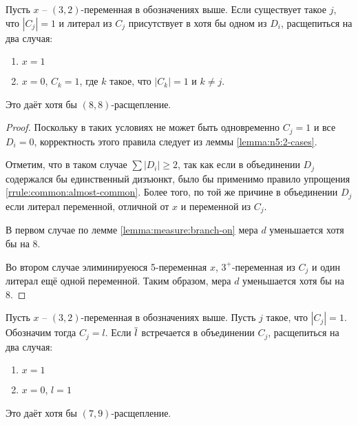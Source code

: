 \begin{brule}
 Пусть $x$ -- $(3,2)$-переменная в обозначениях выше. Если существует такое $j$, что $|C_j| = 1$ и литерал из $C_j$ присутствует в хотя бы одном из $D_i$, расщепиться на два случая:

 \begin{enumerate}
  \item $x = 1$
  \item $x = 0$, $C_k = 1$, где $k$ такое, что $|C_k| = 1$ и $k \neq j$.
 \end{enumerate}

 Это даёт хотя бы $(8,8)$-расщепление.
 \label{brule:n5:32-rest:same}
\end{brule}

\begin{proof}
 Поскольку в таких условиях не может быть одновременно $C_j = 1$ и все $D_i = 0$, корректность этого правила следует из леммы \ref{lemma:n5:2-cases}.

 Отметим, что в таком случае $\sum |D_i| \geq 2$, так как если в объединении $D_j$ содержался бы единственный дизъюнкт, было бы применимо правило упрощения \ref{rrule:common:almost-common}. Более того, по той же причине в объединении $D_j$ если литерал переменной, отличной от $x$ и переменной из $C_j$.

 В первом случае по лемме \ref{lemma:measure:branch-on} мера $d$ уменьшается хотя бы на 8.

 Во втором случае элиминируеюся 5-переменная $x$, $3^+$-переменная из $C_j$ и один литерал ещё одной переменной. Таким образом, мера $d$ уменьшается хотя бы на 8.
\end{proof}

\begin{brule}
 Пусть $x$ -- $(3,2)$-переменная в обозначениях выше. Пусть $j$ такое, что $|C_j| = 1$. Обозначим тогда $C_j = l$. Если $\overline{l}$ встречается в объединении $C_j$, расщепиться на два случая:

 \begin{enumerate}
  \item $x = 1$
  \item $x = 0$, $l = 1$
 \end{enumerate}
 
 Это даёт хотя бы $(7,9)$-расщепление.
 \label{brule:n5:32-rest:compl}
\end{brule}


